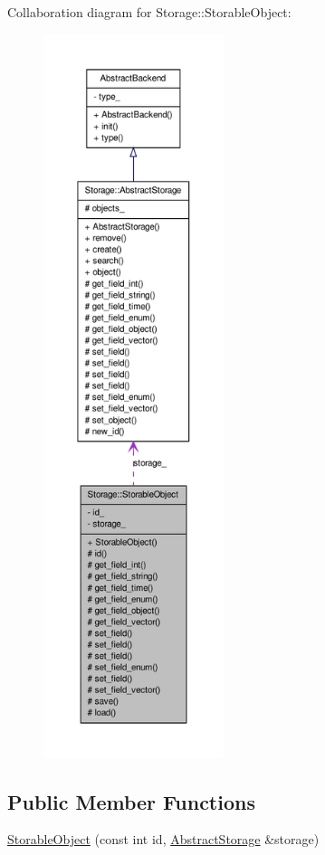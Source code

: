 Collaboration diagram for Storage::StorableObject:
\nopagebreak
\begin{figure}[H]
\begin{center}
\leavevmode
\includegraphics[height=600pt]{db/d62/classStorage_1_1StorableObject__coll__graph}
\end{center}
\end{figure}
\subsection*{Public Member Functions}
\begin{DoxyCompactItemize}
\item 
\hyperlink{classStorage_1_1StorableObject_ac55bb0a7b94a98ff8f14e4164150ecb0}{StorableObject} (const int id, \hyperlink{classStorage_1_1AbstractStorage}{AbstractStorage} \&storage)
\end{DoxyCompactItemize}
